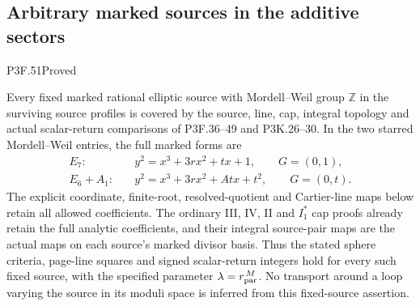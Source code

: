 \subsection{Arbitrary marked sources in the additive sectors}
\begin{statement}{P3F.51}{Proved}

Every fixed marked rational elliptic source with Mordell--Weil group
\(\mathbb Z\) in the surviving source profiles is covered by the
source, line, cap, integral topology and actual scalar-return
comparisons of P3F.36--49 and P3K.26--30. In the two starred
Mordell--Weil entries, the full marked forms are
\[
\begin{aligned}
 E_7:\quad &y^2=x^3+3r x^2+t x+1,\qquad G=(0,1),\\
 E_6+A_1:\quad &y^2=x^3+3r x^2+A t x+t^2,\qquad G=(0,t).
\end{aligned}
\]
The explicit coordinate, finite-root, resolved-quotient and
Cartier-line maps below retain all allowed coefficients.
The ordinary III, IV, II and \(I_1^*\) cap proofs already retain
the full analytic coefficients, and their integral source-pair
maps are the actual maps on each source's marked divisor basis.
Thus the stated sphere criteria, page-line squares and signed
scalar-return integers hold for every such fixed source, with
the specified parameter \(\lambda=r_{\rm par}^{\,M}\).
No transport around a loop varying the source in its moduli
space is inferred from this fixed-source assertion.

\end{statement}
